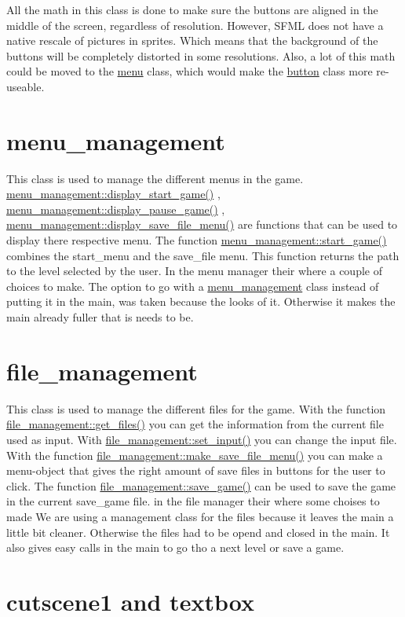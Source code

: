 All the math in this class is done to make sure the buttons are aligned in the middle of the screen, regardless of resolution. However, S\+F\+ML does not have a native rescale of pictures in sprites. Which means that the background of the buttons will be completely distorted in some resolutions. Also, a lot of this math could be moved to the \hyperlink{classmenu}{menu} class, which would make the \hyperlink{classbutton}{button} class more re-\/useable.\hypertarget{index_menu_management}{}\section{menu\+\_\+management}\label{index_menu_management}
This class is used to manage the different menu\textquotesingle{}s in the game. \hyperlink{classmenu__management_aad6e975e03cab2478f3ebec8da7eaf7d}{menu\+\_\+management\+::display\+\_\+start\+\_\+game()} , \hyperlink{classmenu__management_ab7aa6674e3428604073af06efe5aa791}{menu\+\_\+management\+::display\+\_\+pause\+\_\+game()} , \hyperlink{classmenu__management_ac64c1eace3d955be8623a1129597dc54}{menu\+\_\+management\+::display\+\_\+save\+\_\+file\+\_\+menu()} are functions that can be used to display there respective menu. The function \hyperlink{classmenu__management_a92d22f059d33ccc5c3ae485804fd5fbb}{menu\+\_\+management\+::start\+\_\+game()} combines the start\+\_\+menu and the save\+\_\+file menu. This function returns the path to the level selected by the user. In the menu manager their where a couple of choices to make. The option to go with a \hyperlink{classmenu__management}{menu\+\_\+management} class instead of putting it in the main, was taken because the looks of it. Otherwise it makes the main already fuller that is needs to be.\hypertarget{index_file_management}{}\section{file\+\_\+management}\label{index_file_management}
This class is used to manage the different files for the game. With the function \hyperlink{classfile__management_a6c3f90ce958156adea878510097d64ef}{file\+\_\+management\+::get\+\_\+files()} you can get the information from the current file used as input. With \hyperlink{classfile__management_a090d9aba4dd5a795428ccbfe8d4037e6}{file\+\_\+management\+::set\+\_\+input()} you can change the input file. With the function \hyperlink{classfile__management_a97eda13bca5dbe703663bf81f83a77a0}{file\+\_\+management\+::make\+\_\+save\+\_\+file\+\_\+menu()} you can make a menu-\/object that gives the right amount of save files in buttons for the user to click. The function \hyperlink{classfile__management_a79e6ae7cec63aa959d7d0730d6ffa5a3}{file\+\_\+management\+::save\+\_\+game()} can be used to save the game in the current save\+\_\+game file. in the file manager their where some choises to made We are using a management class for the files because it leaves the main a little bit cleaner. Otherwise the files had to be opend and closed in the main. It also gives easy calls in the main to go tho a next level or save a game.\hypertarget{index_cutscene1}{}\section{cutscene1 and textbox}\label{index_cutscene1}
